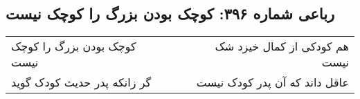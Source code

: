 \begin{center}
\section*{رباعی شماره ۳۹۶: کوچک بودن بزرگ را کوچک نیست}
\label{sec:0396}
\begin{longtable}{l p{0.5cm} r}
کوچک بودن بزرگ را کوچک نیست
&&
هم کودکی از کمال خیزد شک نیست
\\
گر زانکه پدر حدیث کودک گوید
&&
عاقل داند که آن پدر کودک نیست
\\
\end{longtable}
\end{center}
